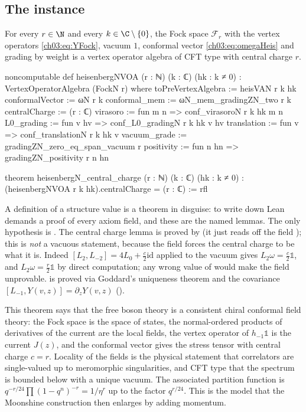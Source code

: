 \subsection{The instance}

\begin{theorem}\label{ch03:thm:heisVOA}
For every $r\in\N$ and every $k\in\C\setminus\{0\}$, the Fock space $\mathcal F_r$ with the
vertex operators \eqref{ch03:eq:YFock}, vacuum $1$, conformal vector \eqref{ch03:eq:omegaHeis}
and grading by weight is a vertex operator algebra of CFT type with central charge $r$.
\end{theorem}
\begin{leancode}
noncomputable def heisenbergNVOA (r : ℕ) (k : ℂ) (hk : k ≠ 0) :
    VertexOperatorAlgebra (FockN r) where
  toPreVertexAlgebra := heisVAN r k hk
  conformalVector := ωN r k
  conformal_mem := ωN_mem_gradingZN_two r k
  centralCharge := (r : ℂ)
  virasoro := fun m n => conf_virasoroN r k hk m n
  L0_grading := fun v hv => conf_L0_gradingN r k hk v hv
  translation := fun v => conf_translationN r k hk v
  vacuum_grade := gradingZN_zero_eq_span_vacuum r
  positivity := fun n hn => gradingZN_positivity r n hn

theorem heisenbergN_central_charge (r : ℕ) (k : ℂ) (hk : k ≠ 0) :
    (heisenbergNVOA r k hk).centralCharge = (r : ℂ) := rfl
\end{leancode}

\begin{dictionary}
A definition of a structure value is a theorem in disguise: to write down
 Lean demands a proof of every axiom field, and these are the named lemmas.
The only hypothesis is . The central charge lemma is proved by  (it
just reads off the field ); this is \emph{not} a vacuous statement, because
the field  forces the central charge to be what it is. Indeed $[L_2,L_{-2}]=4L_0+
\frac{c}{2}\mathrm{id}$ applied to the vacuum gives $L_2\omega=\frac c2\mathbb 1$, and
$L_2\omega=\frac r2\mathbb 1$ by direct computation; any wrong value of  would
make the  field unprovable.  is proved via Goddard's uniqueness
theorem and the covariance $[L_{-1},Y(v,z)]=\partial_zY(v,z)$ ().
\end{dictionary}

\begin{physics}
This theorem says that the free boson theory is a consistent chiral conformal field theory: the Fock space is the space of states, the normal-ordered products of derivatives of the current are the local fields, the vertex operator of $h_{-1}\mathbb 1$ is the current $J(z)$, and the conformal vector gives the stress tensor with central charge $c=r$. Locality of the fields is the physical statement that correlators are single-valued up to meromorphic singularities, and CFT type that the spectrum is bounded below with a unique vacuum. The associated partition function is $q^{-r/24}\prod(1-q^n)^{-r}=1/\eta^r$ up to the factor $q^{r/24}$. This is the model that the Moonshine construction then enlarges by adding momentum.
\end{physics}

